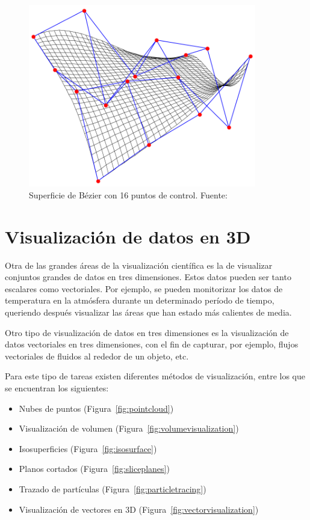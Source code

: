 \begin{figure}[t]
	\centering	
	\includegraphics[height=8cm]{figures/beziersurface.png}
	\caption[Superficie de Bézier con 16 puntos de control.]{Superficie de
	Bézier con 16 puntos de control. Fuente:~\cite{bsurfaceimage}}
	\label{fig:beziersurface}
\end{figure}

\section{Visualización de datos en 3D}
\label{ref:cloud}

Otra de las grandes áreas de la visualización científica es la de visualizar
conjuntos grandes de datos en tres dimensiones. Estos datos pueden ser tanto
escalares como vectoriales. Por ejemplo, se pueden monitorizar los datos de
temperatura en la atmósfera durante un determinado período de tiempo, queriendo
después visualizar las áreas que han estado más calientes de media. 

Otro tipo de visualización de datos en tres dimensiones es la visualización de
datos vectoriales en tres dimensiones, con el fin de capturar, por ejemplo,
flujos vectoriales de fluidos al rededor de un objeto, etc.

Para este tipo de tareas existen diferentes métodos de visualización, entre los
que se encuentran los siguientes:

\begin{itemize}
	\item Nubes de puntos (Figura~\ref{fig:pointcloud})
	\item Visualización de volumen (Figura~\ref{fig:volumevisualization})
	\item Isosuperficies (Figura~\ref{fig:isosurface})
	\item Planos cortados (Figura~\ref{fig:sliceplanes})
	\item Trazado de partículas (Figura~\ref{fig:particletracing})
	\item Visualización de vectores en 3D  (Figura~\ref{fig:vectorvisualization})
\end{itemize}

